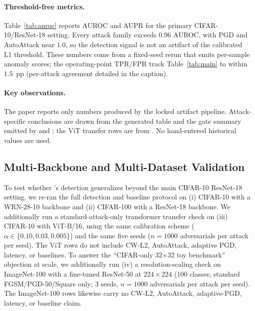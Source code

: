 \paragraph{Threshold-free metrics.}
Table~\ref{tab:auroc} reports AUROC and AUPR for the primary CIFAR-10/ResNet-18
setting. Every attack family exceeds $0.96$ AUROC, with PGD and AutoAttack near
$1.0$, so the detection signal is not an artifact of the calibrated L1 threshold.
These numbers come from a fixed-seed rerun that emits per-sample anomaly scores;
the operating-point TPR/FPR track Table~\ref{tab:main} to within $1.5$~pp
(per-attack agreement detailed in the caption).

\paragraph{Key observations.}
The paper reports only numbers produced by the locked artifact pipeline.
Attack-specific conclusions are drawn from the generated table and the
gate summary emitted by  and
; the ViT transfer rows are from
. No hand-entered historical values
are used.

\subsection{Multi-Backbone and Multi-Dataset Validation}
\label{sec:multi_backbone}

To test whether \prism's detection generalizes beyond the main CIFAR-10
ResNet-18 setting, we re-ran the full detection and baseline protocol on
(i) CIFAR-10 with a WRN-28-10 backbone and (ii) CIFAR-100 with a
ResNet-18 backbone. We additionally run a standard-attack-only
transformer transfer check on (iii) CIFAR-10 with ViT-B/16, using the
same calibration scheme ($\alpha \in \{0.10, 0.03, 0.005\}$) and the
same five seeds ($n=1000$ adversarials per attack per seed). The ViT
rows do not include CW-L2, AutoAttack, adaptive PGD, latency, or
baselines. To answer the ``CIFAR-only 32$\times$32 toy benchmark''
objection at scale, we additionally run (iv) a resolution-scaling check
on ImageNet-100 with a fine-tuned ResNet-50 at $224\times224$ (100
classes; standard FGSM/PGD-50/Square only; 3 seeds, $n=1000$
adversarials per attack per seed). The ImageNet-100 rows likewise carry
no CW-L2, AutoAttack, adaptive-PGD, latency, or baseline claim.

